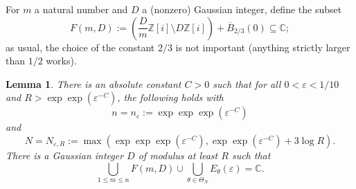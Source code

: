 \documentclass[11pt]{amsart}
\newtheorem{lemma}{Lemma}[section]
\theoremstyle{definition}
\begin{document}
For $m$ a natural number and $D$ a (nonzero) Gaussian integer, define the subset
$$F(m,D):=\left(\frac{D}{m}\mathbb{Z}[i] \setminus D\mathbb{Z}[i]\right)+\overline{B}_{2/3}(0) \subseteq \mathbb{C};$$
as usual, the choice of the constant $2/3$ is not important (anything strictly larger than $1/2$ works).

\begin{lemma}\label{lem:lattice-points}
There is an absolute constant $C>0$ such that for all $0<\varepsilon<1/10$ and $R>\exp\exp(\varepsilon^{-C})$, the following holds with $$n=n_{\varepsilon}:= \exp\exp\exp(\varepsilon^{-C})$$ and $$N=N_{\varepsilon,R}:=\max(\exp\exp\exp(\varepsilon^{-C}),\exp\exp(\varepsilon^{-C})+3\log R).$$ 
There is a Gaussian integer $D$ of modulus at least $R$ such that
$$\bigcup_{1 \leq m \leq n}F(m,D) \cup \bigcup_{\theta \in \Theta_N}E_\theta(\varepsilon)=\mathbb{C}.$$
\end{lemma}
\end{document}
